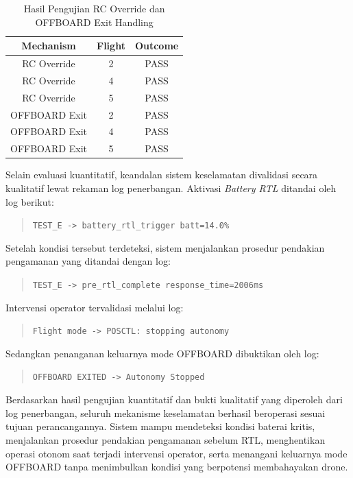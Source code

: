 \begin{table}[H]
	\centering
	\caption{Hasil Pengujian RC Override dan OFFBOARD Exit Handling}
	\label{tab:safety_override}
	\renewcommand{\arraystretch}{1.2}
	\small
	\begin{tabular}{|c|c|c|}
		\hline
		\textbf{Mechanism} &
		\textbf{Flight} &
		\textbf{Outcome}
		\\ \hline
		
		RC Override & 2 & PASS \\ \hline
		RC Override & 4 & PASS \\ \hline
		RC Override & 5 & PASS \\ \hline
		
		OFFBOARD Exit & 2 & PASS \\ \hline
		OFFBOARD Exit & 4 & PASS \\ \hline
		OFFBOARD Exit & 5 & PASS \\ \hline
		
	\end{tabular}
\end{table}

Selain evaluasi kuantitatif, keandalan sistem keselamatan divalidasi secara kualitatif lewat rekaman log penerbangan. Aktivasi \textit{Battery RTL} ditandai oleh log berikut:

\begin{quote}
	\texttt{TEST\_E -> battery\_rtl\_trigger batt=14.0\%}
\end{quote}

Setelah kondisi tersebut terdeteksi, sistem menjalankan prosedur pendakian pengamanan yang ditandai dengan log:

\begin{quote}
	\texttt{TEST\_E -> pre\_rtl\_complete response\_time=2006ms}
\end{quote}

Intervensi operator tervalidasi melalui log:

\begin{quote}
	\texttt{Flight mode -> POSCTL: stopping autonomy}
\end{quote}

Sedangkan penanganan keluarnya mode OFFBOARD dibuktikan oleh log:

\begin{quote}
	\texttt{OFFBOARD EXITED -> Autonomy Stopped}
\end{quote}

Berdasarkan hasil pengujian kuantitatif dan bukti kualitatif yang diperoleh dari log penerbangan, seluruh mekanisme keselamatan berhasil beroperasi sesuai tujuan perancangannya. Sistem mampu mendeteksi kondisi baterai kritis, menjalankan prosedur pendakian pengamanan sebelum RTL, menghentikan operasi otonom saat terjadi intervensi operator, serta menangani keluarnya mode OFFBOARD tanpa menimbulkan kondisi yang berpotensi membahayakan drone.

